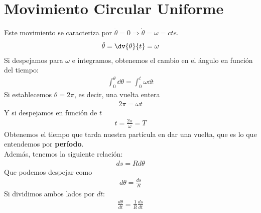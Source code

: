 \documentclass{article}
\begin{document}
\section{Movimiento Circular Uniforme}
Este movimiento se caracteriza por $\ddot{\theta}=0\Rightarrow\dot{\theta}=\omega=cte$.\\
\begin{equation}
    \begin{split}
        \ddot{\theta}=\dv{\theta}{t}=\omega
    \end{split}
\end{equation}
Si despejamos para $\omega$ e integramos, obtenemos el cambio en el ángulo en función del tiempo:
\begin{equation}
    \begin{split}
        \int_{0}^{\theta}\dd{\theta}=\int_{0}^{t}\omega\dd{t}
    \end{split}
\end{equation}
Si establecemos $\theta=2\pi$, es decir, una vuelta entera
\begin{equation}
    \begin{split}
        2\pi=\omega t
    \end{split}
\end{equation}
Y si despejamos en función de $t$
\begin{equation}
    \begin{split}
        t=\frac{2\pi}{\omega}=T
    \end{split}
\end{equation}
Obtenemos el tiempo que tarda nuestra partícula en dar una vuelta, que es lo que entendemos por \textbf{período}.\\
Además, tenemos la siguiente relación:
\begin{equation}
    \begin{split}
        ds=Rd\theta
    \end{split}
\end{equation}
Que podemos despejar como
\begin{equation}
    \begin{split}
        d\theta=\frac{ds}{R}
    \end{split}
\end{equation}
Si dividimos ambos lados por $dt$:
\begin{equation}
    \begin{split}
        \frac{d\theta}{dt}=\frac{1}{R} \frac{ds}{dt}
    \end{split}
\end{equation}
\end{document}

